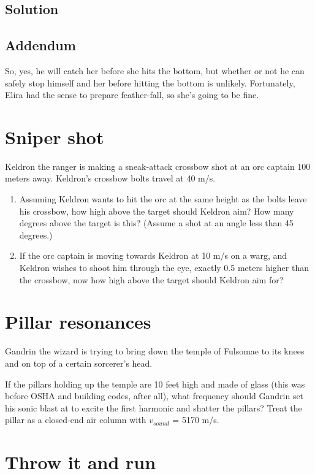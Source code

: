 \documentclass[12pt,letterpaper]{article}
\begin{document}
\subsection{Solution}

\subsection{Addendum}
So, yes, he will catch her before she hits the bottom, but whether or not he can safely stop himself and her before hitting the bottom is unlikely. Fortunately, Elira had the sense to prepare feather-fall, so she's going to be fine.

\section{Sniper shot}

Keldron the ranger is making a sneak-attack crossbow shot at an orc captain 100 meters away. Keldron's crossbow bolts travel at 40 m/s. 

\begin{enumerate}
\item Assuming Keldron wants to hit the orc at the same height as the bolts leave his crossbow, how high above the target should Keldron aim? How many degrees above the target is this? (Assume a shot at an angle less than 45 degrees.)
\item If the orc captain is moving towards Keldron at 10 m/s on a warg, and Keldron wishes to shoot him through the eye, exactly 0.5 meters higher than the crossbow, now how high above the target should Keldron aim for?
\end{enumerate}

\section{Pillar resonances}

Gandrin the wizard is trying to bring down the temple of Fulsomae to its knees and on top of a certain sorcerer's head.

If the pillars holding up the temple are 10 feet high and made of glass (this was before OSHA and building codes, after all), what frequency should Gandrin set his sonic blast at to excite the first harmonic and shatter the pillars? Treat the pillar as a closed-end air column with $v_{sound}$ = 5170 m/s.

\section{Throw it and run}
\end{document}
